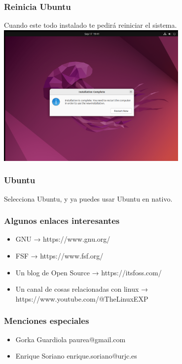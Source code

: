 \documentclass[10pt]{beamer}
\begin{document}
	\begin{frame}
		\frametitle{Reinicia Ubuntu}
		Cuando este todo instalado te pedirá reiniciar el sistema.
		\includegraphics[width=0.7\textwidth]{restart}
	\end{frame}
	
	\begin{frame}
		\frametitle{Ubuntu}
		Selecciona Ubuntu, y ya puedes usar Ubuntu en nativo.
	\end{frame}
	
	\begin{frame}
		\frametitle{Algunos enlaces interesantes}
		\begin{itemize}
			\item GNU → https://www.gnu.org/
			\item FSF → https://www.fsf.org/
			\item Un blog de Open Source → https://itsfoss.com/
			\item Un canal de cosas relacionadas con linux → https://www.youtube.com/@TheLinuxEXP
		\end{itemize}
	\end{frame}
	
	\begin{frame}
		\frametitle{Menciones especiales}
		\begin{itemize}
			\item Gorka Guardiola paurea@gmail.com
			\item Enrique Soriano enrique.soriano@urjc.es
		\end{itemize}
	\end{frame}
\end{document}
